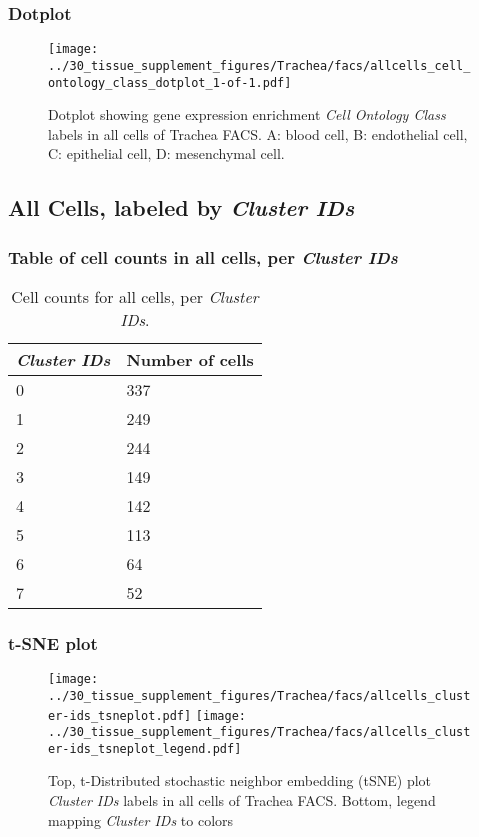 \clearpage

\subsubsection{Dotplot}
\begin{figure}[h]
\centering
\texttt{[image: ../30\_tissue\_supplement\_figures/Trachea/facs/allcells\_cell\_ontology\_class\_dotplot\_1-of-1.pdf]}

\caption{ Dotplot  showing gene expression enrichment \emph{Cell Ontology Class} labels in all cells of Trachea FACS. A: blood cell, B: endothelial cell, C: epithelial cell, D: mesenchymal cell.}
\end{figure}


\clearpage

\subsection{All Cells, labeled by \emph{Cluster IDs}}
\subsubsection{Table of cell counts in all cells, per \emph{Cluster IDs}}\begin{table}[h]
\centering
\label{my-label}
\begin{tabular}{@{}ll@{}}
\toprule

\emph{Cluster IDs}& Number of cells \\ \midrule
0 & 337 \\

1 & 249 \\

2 & 244 \\

3 & 149 \\

4 & 142 \\

5 & 113 \\

6 & 64 \\

7 & 52 \\
\bottomrule
\end{tabular}
\caption{Cell counts for all cells, per \emph{Cluster IDs}.}
\end{table}

\clearpage
\subsubsection{t-SNE plot}
\begin{figure}[h]
\centering
\texttt{[image: ../30\_tissue\_supplement\_figures/Trachea/facs/allcells\_cluster-ids\_tsneplot.pdf]}
\texttt{[image: ../30\_tissue\_supplement\_figures/Trachea/facs/allcells\_cluster-ids\_tsneplot\_legend.pdf]}
\caption{Top, t-Distributed stochastic neighbor embedding (tSNE) plot  \emph{Cluster IDs} labels in all cells of Trachea FACS. Bottom, legend mapping \emph{Cluster IDs} to colors}
\end{figure}


